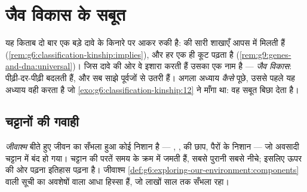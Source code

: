 \chapter{जैव विकास के सबूत}\label{ch:g9:evidence-of-evolution}

यह किताब दो बार एक बड़े दावे के किनारे पर आकर रुकी है:
 की सारी शाखाएँ आपस में मिलती हैं
(\cref{rem:g6:classification-kinship:implies}), और हर  एक ही कूट
पढ़ता है (\cref{rem:g9:genes-and-dna:universal})। जिस दावे की ओर वे
इशारा करती हैं उसका एक नाम है --- \emph{जैव विकास}: 
पीढ़ी-दर-पीढ़ी बदलती हैं, और सब साझे पूर्वजों से उतरी हैं। अगला अध्याय
\emph{कैसे} पूछे, उससे पहले यह अध्याय वही करता है जो
\cref{exo:g6:classification-kinship:12} ने माँगा था: वह सबूत बिछा देता
है।

\section{चट्टानों की गवाही}

\begin{definition}[जीवाश्म]\label{def:g9:evidence-of-evolution:fossils}
\emph{जीवाश्म} बीते हुए जीवन का सँभला हुआ कोई निशान है
--- , ,  की छाप, पैरों के निशान --- जो अवसादी चट्टान में बंद
हो गया। चट्टान की परतें समय के क्रम में जमती हैं, सबसे पुरानी सबसे नीचे;
इसलिए ऊपर की ओर पढ़ना इतिहास पढ़ना है। जीवाश्म
\cref{def:g6:exploring-our-environment:components} वाली सूची का
अवशेषों वाला आधा हिस्सा हैं, जो लाखों साल तक सँभला रहा।
\end{definition}

